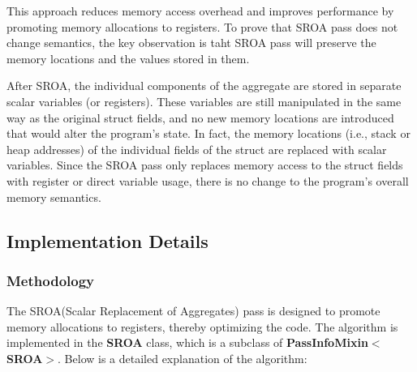 \documentclass[conference]{IEEEtran}
\begin{document}
This approach reduces memory access overhead and improves performance by promoting memory allocations to registers. To prove that SROA pass does not change semantics, the key observation is taht SROA pass will preserve the memory locations and the values stored in them.

After SROA, the individual components of the aggregate are stored in separate scalar variables (or registers). These variables are still manipulated in the same way as the original struct fields, and no new memory locations are introduced that would alter the program’s state. In fact, the memory locations (i.e., stack or heap addresses) of the individual fields of the struct are replaced with scalar variables. Since the SROA pass only replaces memory access to the struct fields with register or direct variable usage, there is no change to the program’s overall memory semantics.

\subsection{Implementation Details}
\subsubsection{Methodology}
The SROA(Scalar Replacement of Aggregates) pass is designed to promote memory allocations to registers, thereby optimizing the code. The algorithm is implemented in the \textbf{SROA} class, which is a subclass of \textbf{PassInfoMixin$<$SROA$>$}. Below is a detailed explanation of the algorithm:
\end{document}
